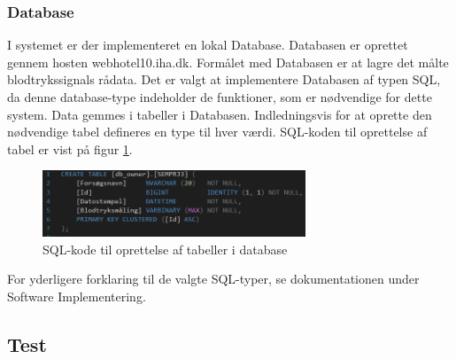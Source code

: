 \subsubsection{Database}
I systemet er der implementeret en lokal Database. Databasen er oprettet gennem hosten webhotel10.iha.dk. Formålet med Databasen er at lagre det målte blodtrykssignals rådata. Det er valgt at implementere Databasen af typen SQL, da denne database-type indeholder de funktioner, som er nødvendige for dette system. Data gemmes i tabeller i Databasen. Indledningsvis for at oprette den nødvendige tabel defineres en type til hver værdi. SQL-koden til oprettelse af tabel er vist på figur \ref{fig:SQL-kode}.
\begin{figure}[H]
	\centering
	\includegraphics[width=0.7\textwidth]{Figurer/SQLDatabase}
	\caption{SQL-kode til oprettelse af tabeller i database}
	\label{fig:SQL-kode}
\end{figure}
For yderligere forklaring til de valgte SQL-typer, se dokumentationen under Software Implementering.

\subsection{Test}

